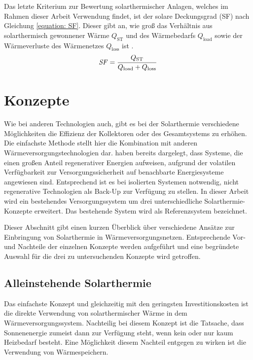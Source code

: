 Das letzte Kriterium zur Bewertung solarthermischer Anlagen, welches im Rahmen dieser Arbeit Verwendung findet, ist der solare Deckungsgrad (\ac{SF}) nach Gleichung \ref{equation: SF}. Dieser gibt an, wie groß das Verhältnis aus solarthermisch gewonnener Wärme $Q_\text{ST}$ und des Wärmebedarfs $Q_\text{load}$ sowie der Wärmeverluste des Wärmenetzes $Q_\text{loss}$ ist \cite{YANG2017471}.
\begin{equation}
\label{equation: SF}
\text{\textit{SF}} = \dfrac{Q_\text{ST}}{Q_\text{load} + Q_\text{loss}}
\end{equation}

\section{Konzepte}\label{section: Konzepte}
Wie bei anderen Technologien auch, gibt es bei der Solarthermie verschiedene Möglichkeiten die Effizienz der Kollektoren oder des Gesamtsystems zu erhöhen. Die einfachste Methode stellt hier die Kombination mit anderen Wärmeversorgungstechnologien dar. \citet{ALBERGOSTERGAARD20104892} haben bereits dargelegt, dass Systeme, die einen großen Anteil regenerativer Energien aufweisen, aufgrund der volatilen Verfügbarkeit zur Versorgungssicherheit auf benachbarte Energiesysteme angewiesen sind. Entsprechend ist es bei isolierten Systemen notwendig, nicht regenerative Technologien als Back-Up zur Verfügung zu stellen. In dieser Arbeit wird ein bestehendes Versorgungssystem um drei unterschiedliche Solarthermie-Konzepte erweitert. Das bestehende System wird als Referenzsystem bezeichnet. 

Dieser Abschnitt gibt einen kurzen Überblick über verschiedene Ansätze zur Einbringung von Solarthermie in Wärmeversorgungsnetzen. Entsprechende Vor- und Nachteile der einzelnen Konzepte werden aufgeführt und eine begründete Auswahl für die drei zu untersuchenden Konzepte wird getroffen.

\subsection*{Alleinstehende Solarthermie}
Das einfachste Konzept und gleichzeitig mit den geringsten Investitionskosten ist die direkte Verwendung von solarthermischer Wärme in dem Wärmeversorgungssystem. Nachteilig bei diesem Konzept ist die Tatsache, dass Sonnenenergie zumeist dann zur Verfügung steht, wenn kein oder nur kaum Heizbedarf besteht. Eine Möglichkeit diesem Nachteil entgegen zu wirken ist die Verwendung von Wärmespeichern.


